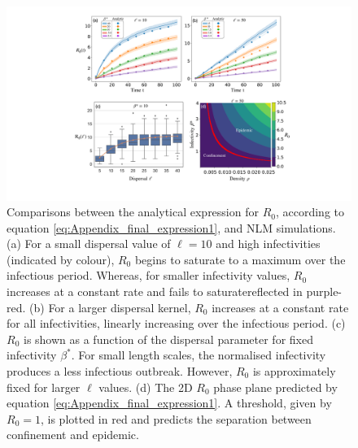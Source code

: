 \begin{figure}
    \centering
    \includegraphics[scale=0.40]{chapter5/figures/fig3-R0-analytic.pdf}
    \caption{Comparisons between the analytical expression for $R_0$, according to equation \ref{eq:Appendix_final_expression1}, and NLM simulations. (a) For a small dispersal value of $\ell=10$ and high infectivities (indicated by colour), $R_0$ begins to saturate to a maximum over the infectious period. Whereas, for smaller infectivity values, $R_0$ increases at a constant rate and fails to saturate\textemdash reflected in purple-red. (b) For a larger dispersal kernel, $R_0$ increases at a constant rate for all infectivities, linearly increasing over the infectious period. (c) $R_0$ is shown as a function of the dispersal parameter for fixed infectivity $\beta^*$. For small length scales, the normalised infectivity produces a less infectious outbreak. However, $R_0$ is approximately fixed for larger $\ell$ values. (d) The 2D $R_0$ phase plane predicted by equation \ref{eq:Appendix_final_expression1}. A threshold, given by $R_0=1$, is plotted in red and predicts the separation between confinement and epidemic.}
    \label{fig:my_label}
\end{figure}

